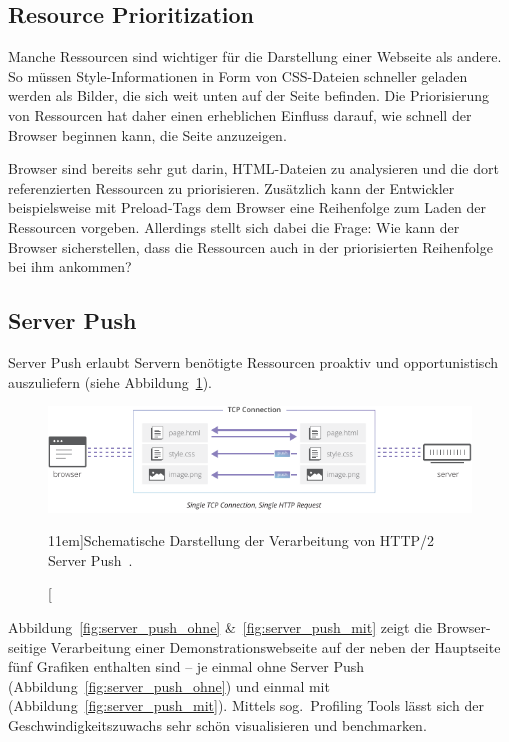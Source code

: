 \documentclass[a4paper, justified, notoc]{tufte-handout} %
\begin{document}
\subsection{Resource Prioritization} %
\label{sub:resource_prioritization}

Manche Ressourcen sind wichtiger für die Darstellung einer Webseite als andere. So müssen Style-Informationen in Form von CSS-Dateien schneller geladen werden als Bilder, die sich weit unten auf der Seite befinden. Die Priorisierung von Ressourcen hat daher einen erheblichen Einfluss darauf, wie schnell der Browser beginnen kann, die Seite anzuzeigen.

Browser sind bereits sehr gut darin, HTML-Dateien zu analysieren und die dort referenzierten Ressourcen zu priorisieren. Zusätzlich kann der Entwickler beispielsweise mit Preload-Tags dem Browser eine Reihenfolge zum Laden der Ressourcen vorgeben. Allerdings stellt sich dabei die Frage: Wie kann der Browser sicherstellen, dass die Ressourcen auch in der priorisierten Reihenfolge bei ihm ankommen?



\subsection{Server Push} %
\label{sub:server_push}

Server Push erlaubt Servern benötigte Ressourcen proaktiv und opportunistisch auszuliefern (siehe Abbildung~\ref{fig:schema_http2_server_push}).  

\begin{figure}%
	\centering
  \includegraphics[width=1.55\textwidth]{./figures/http2_server_push.pdf}
  \caption[][11em]{Schematische Darstellung der Verarbeitung von HTTP/2 Server Push~\citep{vlad:2016}.}
  \label{fig:schema_http2_server_push}
\end{figure}


Abbildung~\ref{fig:server_push_ohne} \&~\ref{fig:server_push_mit} zeigt die Browser-seitige Verarbeitung einer Demonstrationswebseite auf der neben der Hauptseite fünf Grafiken enthalten sind -- je einmal ohne Server Push (Abbildung~\ref{fig:server_push_ohne}) und einmal mit (Abbildung~\ref{fig:server_push_mit}).
Mittels sog.\ Profiling Tools lässt sich der Geschwindigkeitszuwachs sehr schön visualisieren und benchmarken. 
\end{document}
